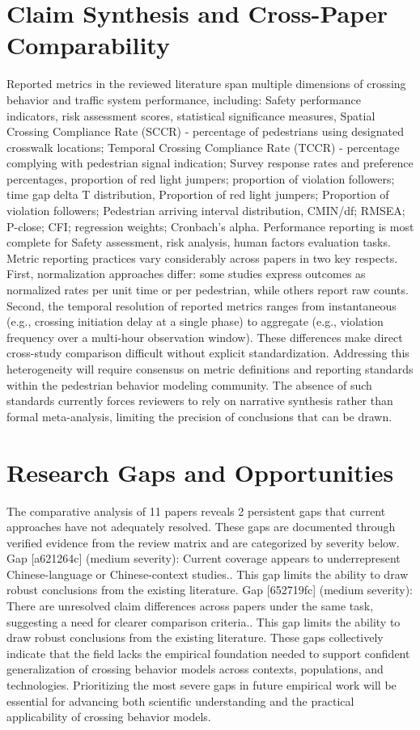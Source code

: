 \documentclass{article}
\begin{document}
\section{Claim Synthesis and Cross-Paper Comparability}
Reported metrics in the reviewed literature span multiple dimensions of crossing behavior and traffic system performance, including: Safety performance indicators, risk assessment scores, statistical significance measures, Spatial Crossing Compliance Rate (SCCR) - percentage of pedestrians using designated crosswalk locations; Temporal Crossing Compliance Rate (TCCR) - percentage complying with pedestrian signal indication; Survey response rates and preference percentages, proportion of red light jumpers; proportion of violation followers; time gap delta T distribution, Proportion of red light jumpers; Proportion of violation followers; Pedestrian arriving interval distribution, CMIN/df; RMSEA; P-close; CFI; regression weights; Cronbach's alpha. Performance reporting is most complete for Safety assessment, risk analysis, human factors evaluation tasks. Metric reporting practices vary considerably across papers in two key respects. First, normalization approaches differ: some studies express outcomes as normalized rates per unit time or per pedestrian, while others report raw counts. Second, the temporal resolution of reported metrics ranges from instantaneous (e.g., crossing initiation delay at a single phase) to aggregate (e.g., violation frequency over a multi-hour observation window). These differences make direct cross-study comparison difficult without explicit standardization. Addressing this heterogeneity will require consensus on metric definitions and reporting standards within the pedestrian behavior modeling community. The absence of such standards currently forces reviewers to rely on narrative synthesis rather than formal meta-analysis, limiting the precision of conclusions that can be drawn.

\section{Research Gaps and Opportunities}
The comparative analysis of 11 papers reveals 2 persistent gaps that current approaches have not adequately resolved. These gaps are documented through verified evidence from the review matrix and are categorized by severity below. Gap [a621264c] (medium severity): Current coverage appears to underrepresent Chinese-language or Chinese-context studies.. This gap limits the ability to draw robust conclusions from the existing literature. Gap [652719fc] (medium severity): There are unresolved claim differences across papers under the same task, suggesting a need for clearer comparison criteria.. This gap limits the ability to draw robust conclusions from the existing literature. These gaps collectively indicate that the field lacks the empirical foundation needed to support confident generalization of crossing behavior models across contexts, populations, and technologies. Prioritizing the most severe gaps in future empirical work will be essential for advancing both scientific understanding and the practical applicability of crossing behavior models.
\end{document}
